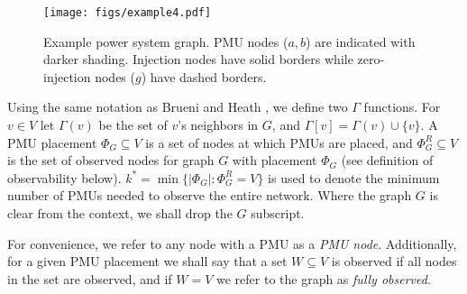 \begin{figure}[t]
\centering
\texttt{[image: figs/example4.pdf]}
\caption{Example power system graph. PMU nodes ($a,b$) are indicated with darker shading. Injection nodes have solid borders while zero-injection nodes  ($g$) have dashed borders.}
\label{fig:example}
\end{figure}

Using the same notation as Brueni and Heath \cite{Brueni05}, we define two $\Gamma$ functions. For $v\in V$ let $\Gamma(v)$ be the set of $v$'s neighbors in $G$, and $\Gamma[v] = \Gamma(v)\cup \{v\}$. 
A PMU placement $\Phi_G \subseteq V$ is a set of nodes at which PMUs are placed,
and $\Phi^R_G\subseteq V$ is the set of observed nodes for graph $G$ with placement $\Phi_G$ (see definition of observability below). %
$k^* = \min \{|\Phi_G|:\Phi^R_G=V\}$ is used to denote the minimum number of PMUs needed to observe the entire network. Where the graph $G$ is clear from the context, we shall drop the $G$ subscript.


For convenience, we refer to any node with a PMU as a \emph{PMU node}. Additionally, for a given PMU placement we shall say that a set $W\subseteq V$ is observed if all nodes in the set are observed, and if $W=V$ we refer to the graph as \emph{fully observed}. 


